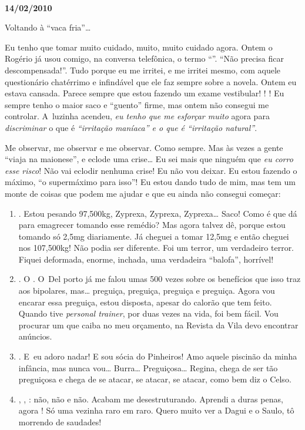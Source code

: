 \begin{center}\asterisc{}​\end{center}

\begin{flushright}\textbf{14/02/2010}\end{flushright}


Voltando à ``vaca fria''…

Eu tenho que tomar muito cuidado, muito, muito cuidado agora. Ontem o
Rogério já usou comigo, na conversa telefônica, o termo
``''. ``Não precisa ficar descompensada!''. Tudo porque eu
me irritei, e me irritei mesmo, com aquele questionário chatérrimo e
infindável que ele faz sempre sobre a novela. Ontem eu estava cansada.
Parece sempre que estou fazendo um exame vestibular! ! !
Eu sempre tenho o maior saco e ``guento'' firme, mas ontem não consegui
me controlar. A~luzinha acendeu, \emph{eu tenho que me esforçar muito}
agora para \emph{discriminar} o que é \emph{``irritação maníaca'' e o
que é ``irritação natural''}.

Me observar, me observar e me observar. Como sempre. Mas às vezes a
gente ``viaja na maionese'', e eclode uma crise… Eu sei mais que
ninguém que \emph{eu corro esse risco}! Não vai eclodir nenhuma crise!
Eu não vou deixar. Eu estou fazendo o máximo, ``o supermáximo para
isso''! Eu estou dando tudo de mim, mas tem um monte de coisas que podem
me ajudar e que eu ainda não consegui começar:

\begin{enumerate}
\item
  . Estou pesando 97,500kg, Zyprexa, Zyprexa, Zyprexa…
  Saco! Como é que dá para emagrecer tomando esse remédio? Mas agora
  talvez dê, porque estou tomando só 2,5mg diariamente. Já cheguei a
  tomar 12,5mg e então cheguei nos 107,500kg! Não podia ser diferente.
  Foi um terror, um verdadeiro terror. Fiquei deformada, enorme,
  inchada, uma verdadeira ``balofa'', horrível!
\item
  .  O   . O~Del porto já me falou umas 500
  vezes sobre os benefícios que isso traz aos bipolares, mas…
  preguiça, preguiça, preguiça e preguiça. Agora vou encarar essa
  preguiça, estou disposta, apesar do calorão que tem feito. Quando tive
  \emph{personal trainer}, por duas vezes na vida, foi bem fácil. Vou
  procurar um que caiba no meu orçamento, na Revista da Vila devo
  encontrar anúncios.
\item
  . E~eu adoro nadar! E sou sócia do Pinheiros! Amo aquele piscinão
  da minha infância, mas nunca vou… Burra…
  Preguiçosa… Regina, chega de ser tão preguiçosa e chega de se
  atacar, se atacar, se atacar, como bem diz o Celso.
\item
  , \emph{}, : não, não e não. Acabam me
  desestruturando. Aprendi a duras penas, agora ! Só uma vezinha
  raro em raro. Quero muito ver a Dagui e o Saulo, tô morrendo de
  saudades!
\end{enumerate}

